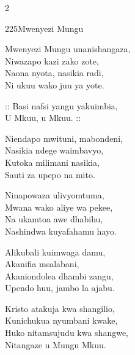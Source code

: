 \begin{multicols}{2}
\begin{hymn}{225}{Mwenyezi Mungu}{}
\begin{stanza}
Mwenyezi Mungu unanishangaza,\\
Niwazapo kazi zako zote,\\
Naona nyota, nasikia radi,\\
Ni ukuu wako juu ya yote.
\end{stanza}
\begin{chorus}
:: Basi nafsi yangu yakuimbia,\\
U Mkuu, u Mkuu. ::
\end{chorus}
\begin{stanza}
Niendapo mwituni, mabondeni,\\
Nasikia ndege waimbavyo,\\
Kutoka milimani nasikia,\\
Sauti za upepo na mito.
\end{stanza}
\begin{stanza}
Ninapowaza ulivyomtuma,\\
Mwana wako aliye wa pekee,\\
Na ukamtoa awe dhabihu,\\
Nashindwa kuyafahamu hayo.
\end{stanza}
\begin{stanza}
Alikubali kuimwaga damu,\\
Akanifia msalabani,\\
Akaniondolea dhambi zangu,\\
Upendo huu, jambo la ajabu.
\end{stanza}
\begin{stanza}
Kristo atakuja kwa shangilio,\\
Kunichukua nyumbani kwake,\\
Huko nitamsujudu kwa shangwe,\\
Nitangaze u Mungu Mkuu.
\end{stanza}
\end{hymn}


\end{multicols}
